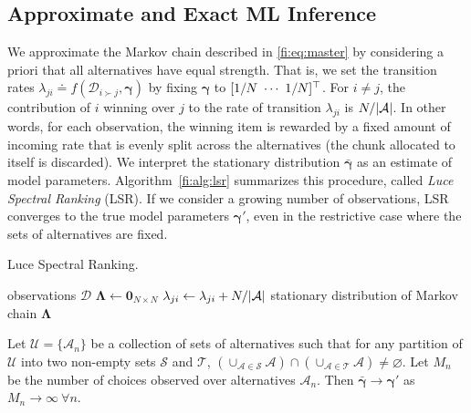 \subsection{Approximate and Exact ML Inference}

We approximate the Markov chain described in \eqref{fi:eq:master} by considering a priori that all alternatives have equal strength.
That is, we set the transition rates $\lambda_{ji} \doteq f(\mathcal{D}_{i \succ j}, \bm{\gamma})$ by fixing $\bm{\gamma}$ to $[1/N \  \cdots \  1/N]^\top$.
For $i \ne j$, the contribution of $i$ winning over $j$ to the rate of transition $\lambda_{ji}$ is $N / \lvert\mathcal{A}\rvert$.
In other words, for each observation, the winning item is rewarded by a fixed amount of incoming rate that is evenly split across the alternatives (the chunk allocated to itself is discarded).
We interpret the stationary distribution $\bar{\bm{\gamma}}$ as an estimate of model parameters.
Algorithm~\ref{fi:alg:lsr} summarizes this procedure, called \emph{Luce Spectral Ranking} (LSR).
If we consider a growing number of observations, LSR converges to the true model parameters $\bm{\gamma}'$, even in the restrictive case where the sets of alternatives are fixed.

\begin{algorithm}[t]
  \caption{Luce Spectral Ranking.}
  \label{fi:alg:lsr}
  \begin{algorithmic}[1]
    \Require observations $\mathcal{D}$
    \State $\bm{\Lambda} \gets \bm{0}_{N \times N}$
        \State $\lambda_{ji} \gets \lambda_{ji} + N / \lvert\mathcal{A}\rvert$
      \EndFor
    \EndFor
    \State \Return stationary distribution of Markov chain $\bm{\Lambda}$
  \end{algorithmic}
\end{algorithm}

\begin{theorem}
\label{fi:thm:consistency}
Let $\mathcal{U} = \{ \mathcal{A}_n \}$ be a collection of sets of alternatives such that for any partition of $\mathcal{U}$ into two non-empty sets $\mathcal{S}$ and $\mathcal{T}$, $\left( \cup_{\mathcal{A} \in \mathcal{S}} \mathcal{A} \right) \cap \left( \cup_{\mathcal{A} \in \mathcal{T}} \mathcal{A} \right) \ne \varnothing$.
Let $M_n$ be the number of choices observed over alternatives $\mathcal{A}_n$.
Then $\bar{\bm{\gamma}} \to \bm{\gamma}'$ as $M_n \to \infty \ \forall n$.
\end{theorem}

